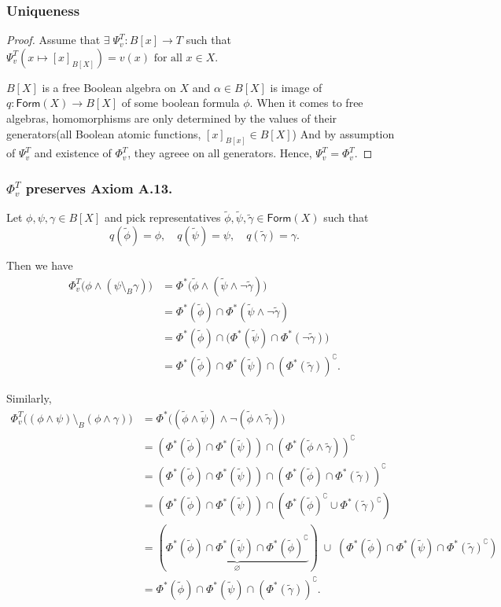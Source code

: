 \subsubsection*{Uniqueness}
\begin{proof}
Assume that $\exists\;\Psi_v^T:B[x]\rightarrow T$ such that $\Psi_v^T(x\mapsto [x]_{B[X]})=v(x)\text{ for all }x \in X$.

$B[X]$ is a free Boolean algebra on $X$  and $\alpha \in B[X]$ is image of $q:\mathsf{Form}(X)\rightarrow B[X]$ of some boolean formula $\phi$. 
When it comes to free algebras, homomorphisms are only determined by the values of their generators(all Boolean atomic functions, $[x]_{B[x]}\in B[X]$)
And by assumption of $\Psi_v^T$ and existence of $\Phi_v^T$, they agreee on all generators. Hence, $\Psi_v^T=\Phi_v^T$.
\end{proof}

\subsubsection*{$\Phi_v^T$ preserves Axiom A.13.}

Let $\phi, \psi, \gamma \in B[X]$ and pick representatives $\tilde{\phi}, \tilde{\psi}, \tilde{\gamma} \in \mathsf{Form}(X)$ such that
\[
q(\tilde{\phi}) = \phi, \quad q(\tilde{\psi}) = \psi, \quad q(\tilde{\gamma}) = \gamma.
\]

Then we have
\[
\begin{aligned}
\Phi_v^T\big(\phi \wedge (\psi \setminus_B \gamma)\big) 
&= \Phi^*\big(\tilde{\phi} \wedge (\tilde{\psi} \wedge \neg \tilde{\gamma})\big) \\
&= \Phi^*(\tilde{\phi}) \cap \Phi^*(\tilde{\psi} \wedge \neg \tilde{\gamma}) \\
&= \Phi^*(\tilde{\phi}) \cap \big(\Phi^*(\tilde{\psi}) \cap \Phi^*(\neg \tilde{\gamma})\big) \\
&= \Phi^*(\tilde{\phi}) \cap \Phi^*(\tilde{\psi}) \cap (\Phi^*(\tilde{\gamma}))^\complement.
\end{aligned}
\]

Similarly,
\[
\begin{aligned}
\Phi_v^T\big((\phi \wedge \psi) \setminus_B (\phi \wedge \gamma)\big) 
&= \Phi^*\big((\tilde{\phi} \wedge \tilde{\psi}) \wedge \neg (\tilde{\phi} \wedge \tilde{\gamma})\big) \\
&= (\Phi^*(\tilde{\phi}) \cap \Phi^*(\tilde{\psi})) \cap (\Phi^*(\tilde{\phi} \wedge \tilde{\gamma}))^\complement \\
&= (\Phi^*(\tilde{\phi}) \cap \Phi^*(\tilde{\psi})) \cap (\Phi^*(\tilde{\phi}) \cap \Phi^*(\tilde{\gamma}))^\complement \\
&= (\Phi^*(\tilde{\phi}) \cap \Phi^*(\tilde{\psi})) \cap (\Phi^*(\tilde{\phi})^\complement \cup \Phi^*(\tilde{\gamma})^\complement) \\
&= (\underbrace{\Phi^*(\tilde{\phi}) \cap \Phi^*(\tilde{\psi}) \cap \Phi^*(\tilde{\phi})^\complement}_{\varnothing}) 
   \;\cup\; (\Phi^*(\tilde{\phi}) \cap \Phi^*(\tilde{\psi}) \cap \Phi^*(\tilde{\gamma})^\complement) \\
&= \Phi^*(\tilde{\phi}) \cap \Phi^*(\tilde{\psi}) \cap (\Phi^*(\tilde{\gamma}))^\complement.
\end{aligned}
\]

